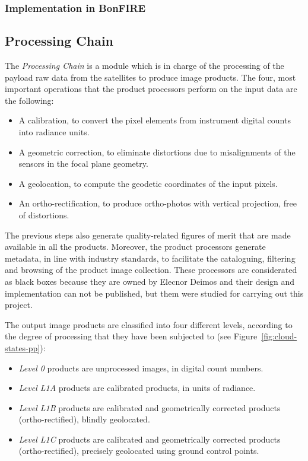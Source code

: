 \begin{enumerate}
\subsubsection{Implementation in BonFIRE}




\subsection{Processing Chain}


The \emph{Processing Chain} is a module which is in charge of the processing of the
payload raw data from the satellites to produce image products. The four, most
important operations that the product processors perform on the input data are
the following:
\begin{itemize}
\item A calibration, to convert the pixel elements from instrument digital counts into radiance units.
\item A geometric correction, to eliminate distortions due to misalignments of the sensors in the focal plane geometry.
\item A geolocation, to compute the geodetic coordinates of the input pixels.
\item An ortho-rectification, to produce ortho-photos with vertical projection, free of distortions.
\end{itemize}

The previous steps also generate quality-related figures of merit that are made
available in all the products. Moreover, the product processors generate
metadata, in line with industry standards, to facilitate the cataloguing,
filtering and browsing of the product image collection. These processors are
considerated as black boxes because they are owned by Elecnor Deimos and their
design and implementation can not be published, but them were studied for
carrying out this project.

The output image products are classified into four different levels, according to the degree of processing that they have been subjected to (see Figure~\ref{fig:cloud-states-pp}):
\begin{itemize}

\item \emph{Level 0} products are unprocessed images, in digital count numbers.
\item \emph{Level L1A} products are calibrated products, in units of radiance.
\item \emph{Level L1B} products are calibrated and geometrically corrected products (ortho-rectified), blindly geolocated.
\item \emph{Level L1C} products are calibrated and geometrically corrected products (ortho-rectified), precisely geolocated using ground control points.
\end{itemize}


\end{enumerate}
